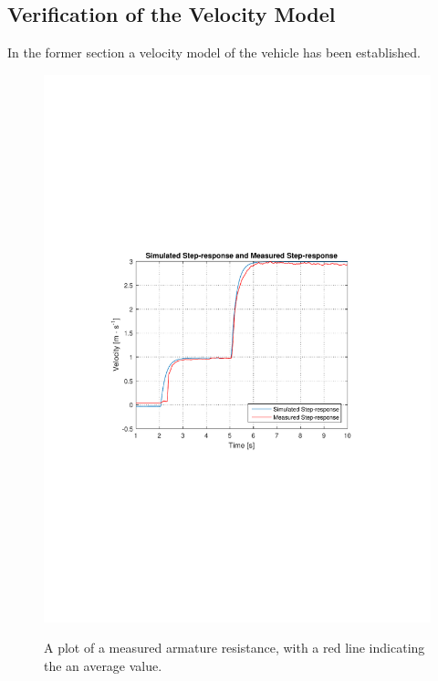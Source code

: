 \subsection{Verification of the Velocity Model}
In the former section a velocity model of the vehicle has been established.


\begin{figure}[H]
  \centering
  {
    \includegraphics[width=1.2\textwidth]{figures/SimulationIRLsteprespons2.pdf}
  }
  \caption{A plot of a measured armature resistance, with a red line indicating the an average value.}
  \label{armatureResistance}
\end{figure}

